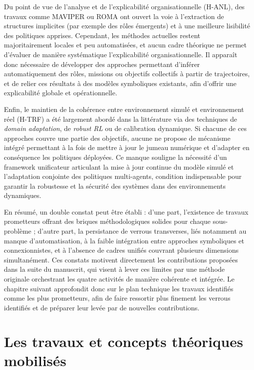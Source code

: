 Du point de vue de l’analyse et de l’explicabilité organisationnelle (H-ANL), des travaux comme MAVIPER ou ROMA ont ouvert la voie à l’extraction de structures implicites (par exemple des rôles émergents) et à une meilleure lisibilité des politiques apprises. Cependant, les méthodes actuelles restent majoritairement locales et peu automatisées, et aucun cadre théorique ne permet d’évaluer de manière systématique l’explicabilité organisationnelle. Il apparaît donc nécessaire de développer des approches permettant d’inférer automatiquement des rôles, missions ou objectifs collectifs à partir de trajectoires, et de relier ces résultats à des modèles symboliques existants, afin d’offrir une explicabilité globale et opérationnelle.

Enfin, le maintien de la cohérence entre environnement simulé et environnement réel (H-TRF) a été largement abordé dans la littérature via des techniques de \textit{domain adaptation}, de \textit{robust RL} ou de calibration dynamique. Si chacune de ces approches couvre une partie des objectifs, aucune ne propose de mécanisme intégré permettant à la fois de mettre à jour le jumeau numérique et d’adapter en conséquence les politiques déployées. Ce manque souligne la nécessité d’un framework unificateur articulant la mise à jour continue du modèle simulé et l’adaptation conjointe des politiques multi-agents, condition indispensable pour garantir la robustesse et la sécurité des systèmes dans des environnements dynamiques.

En résumé, un double constat peut être établi : d’une part, l’existence de travaux prometteurs offrant des briques méthodologiques solides pour chaque sous-problème ; d’autre part, la persistance de verrous transverses, liés notamment au manque d’automatisation, à la faible intégration entre approches symboliques et connexionnistes, et à l’absence de cadres unifiés couvrant plusieurs dimensions simultanément. Ces constats motivent directement les contributions proposées dans la suite du manuscrit, qui visent à lever ces limites par une méthode originale orchestrant les quatre activités de manière cohérente et intégrée. Le chapitre suivant approfondit donc sur le plan technique les travaux identifiés comme les plus prometteurs, afin de faire ressortir plus finement les verrous identifiés et de préparer leur levée par de nouvelles contributions.

\clearpage
\thispagestyle{empty}
\null
\newpage

\chapter{Les travaux et concepts théoriques mobilisés}
\label{chap:concepts}


